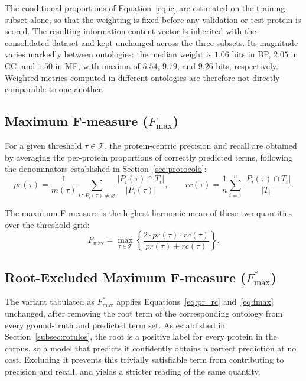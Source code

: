 \documentclass[Ingles]{ic-tese-v3}
\begin{document}
The conditional proportions of Equation~\ref{eq:ic} are estimated on the training
subset alone, so that the weighting is fixed before any validation or test
protein is scored. The resulting information content vector is inherited with the
consolidated dataset and kept unchanged across the three subsets. Its magnitude
varies markedly between ontologies: the median weight is $1.06$ bits in BP,
$2.05$ in CC, and $1.50$ in MF, with maxima of $5.54$, $9.79$, and $9.26$ bits,
respectively. Weighted metrics computed in different ontologies are therefore not
directly comparable to one another.

\subsection{Maximum F-measure (\texorpdfstring{$F_{\max}$}{Fmax})}
\label{subsec:fmax}

For a given threshold $\tau \in \mathcal{T}$, the protein-centric precision and
recall are obtained by averaging the per-protein proportions of correctly
predicted terms, following the denominators established in
Section~\ref{sec:protocolo}:
\begin{equation}
\label{eq:pr_rc}
pr(\tau) = \frac{1}{m(\tau)}
\sum_{i \,:\, P_i(\tau) \neq \varnothing}
\frac{\bigl| P_i(\tau) \cap T_i \bigr|}{\bigl| P_i(\tau) \bigr|},
\qquad
rc(\tau) = \frac{1}{n}
\sum_{i=1}^{n}
\frac{\bigl| P_i(\tau) \cap T_i \bigr|}{\bigl| T_i \bigr|}.
\end{equation}

The maximum F-measure is the highest harmonic mean of these two quantities over
the threshold grid:
\begin{equation}
\label{eq:fmax}
F_{\max} = \max_{\tau \in \mathcal{T}}
\left\{
\frac{2 \cdot pr(\tau) \cdot rc(\tau)}{pr(\tau) + rc(\tau)}
\right\}.
\end{equation}

\subsection{Root-Excluded Maximum F-measure (\texorpdfstring{$F_{\max}^{*}$}{Fmax*})}
\label{subsec:fmaxstar}

The variant tabulated as $F_{\max}^{*}$ applies Equations~\ref{eq:pr_rc}
and~\ref{eq:fmax} unchanged, after removing the root term of the corresponding
ontology from every ground-truth and predicted term set. As established in
Section~\ref{subsec:rotulos}, the root is a positive label for every protein in
the corpus, so a model that predicts it confidently obtains a correct prediction
at no cost. Excluding it prevents this trivially satisfiable term from
contributing to precision and recall, and yields a stricter reading of the same
quantity.
\end{document}
